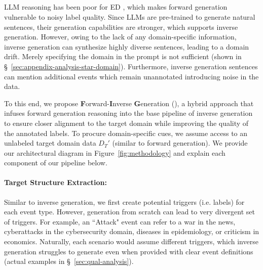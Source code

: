 
\subsection{\modelName}

LLM reasoning has been poor for ED \cite{DBLP:journals/corr/abs-2304-11633, huang-etal-2024-textee}, which makes forward generation vulnerable to noisy label quality.
Since LLMs are pre-trained to generate natural sentences, their generation capabilities are stronger, which supports inverse generation.
However, owing to the lack of any domain-specific information, inverse generation can synthesize highly diverse sentences, leading to a domain drift.
Merely specifying the domain in the prompt is not sufficient (shown in \S~\ref{sec:appendix-analysis-star-domain}).
Furthermore, inverse generation sentences can mention additional events which remain unannotated introducing noise in the data.

To this end, we propose \textbf{F}orward-\textbf{I}nverse \textbf{G}eneration (\modelName), a hybrid approach that infuses forward generation reasoning into the base pipeline of inverse generation to ensure closer alignment to the target domain while improving the quality of the annotated labels.
To procure domain-specific cues, we assume access to an unlabeled target domain data $D_T'$ (similar to forward generation).
We provide our architectural diagram in Figure~\ref{fig:methodology} and explain each component of our pipeline below.

\paragraph{Target Structure Extraction:}
Similar to inverse generation, we first create potential triggers (i.e. labels) for each event type.
However, generation from scratch can lead to very divergent set of triggers.
For example, an ``Attack" event can refer to a war in the news, cyberattacks in the cybersecurity domain, diseases in epidemiology, or criticism in economics.
Naturally, each scenario would assume different triggers, which inverse generation struggles to generate even when provided with clear event definitions (actual examples in \S~\ref{sec:qual-analysis}).

